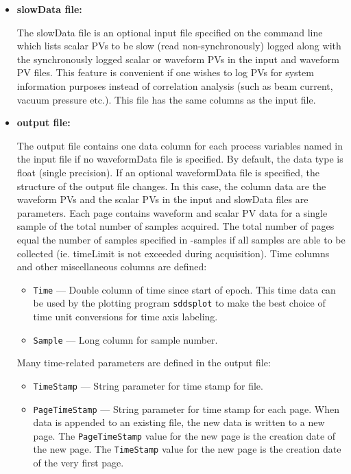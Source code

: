 \begin{itemize}
\begin{itemize}
\item {\bf slowData file:} \par The slowData file is an optional input
file specified on the command line which lists scalar PVs to be slow
(read non-synchronously) logged along with the synchronously logged
scalar or waveform PVs in the input and waveform PV files.  This feature is
convenient if one wishes to log PVs for system information purposes instead of
correlation analysis (such as beam current, vacuum pressure etc.).  This file has
the same columns as the input file.

\item {\bf output file:}\par The output file contains one data column
for each process variables named in the input file if no waveformData
file is specified. By default, the data type is float (single
precision).  If an optional waveformData file is specified, the
structure of the output file changes.  In this case, the column data
are the waveform PVs and the scalar PVs in the input and slowData
files are parameters.  Each page contains waveform and scalar PV data
for a single sample of the total number of samples acquired.  The
total number of pages equal the number of samples specified in
-samples if all samples are able to be collected (ie. timeLimit is not
exceeded during acquisition).  Time columns and other miscellaneous
columns are defined:
\begin{itemize}
        \item {\tt Time} --- Double column of time since start of epoch. This time data can be used by
        the plotting program {\verb+sddsplot+} to make the best choice of time unit conversions
        for time axis labeling.
        \item {\tt Sample} --- Long column for sample number.
\end{itemize}
Many time-related parameters are defined in the output file:
\begin{itemize}
        \item {\tt TimeStamp} --- String parameter for time stamp for file.
        \item {\tt PageTimeStamp} --- String parameter for time stamp for each page. When data
                is appended to an existing file, the new data is written to a new
                page. The {\tt PageTimeStamp} value for the new page is the creation
                date of the new page. The {\tt TimeStamp} value for the new page is the creation 
                date of the very first page.

\end{itemize}
\end{itemize}
\end{itemize}
